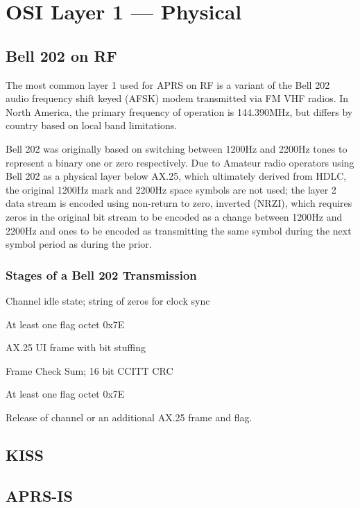 \chapter{OSI Layer 1 --- Physical}

\section{Bell 202 on RF}

The most common layer 1 used for APRS on RF is a variant of the
Bell 202 audio frequency shift keyed (AFSK) modem transmitted via 
FM VHF radios. In North America, the primary frequency of operation is
144.390MHz, but differs by country based on local band limitations.

Bell 202 was originally  based on switching between 1200Hz and 2200Hz tones to
represent a binary one or zero respectively. Due to Amateur radio operators
using Bell 202 as a physical layer below AX.25, which ultimately derived 
from HDLC, the original 1200Hz mark and 2200Hz space symbols are not used;
the layer 2 data stream is encoded using 
non-return to zero, inverted (NRZI),
which requires zeros in the original bit stream to be encoded as a change
between 1200Hz and 2200Hz and ones to be encoded as transmitting the same
symbol during the next symbol period as during the prior.

\subsection{Stages of a Bell 202 Transmission}

Channel idle state; string of zeros for clock sync

At least one flag octet 0x7E

AX.25 UI frame with bit stuffing

Frame Check Sum; 16 bit CCITT CRC

At least one flag octet 0x7E

Release of channel or an additional AX.25 frame and flag. 

\section{KISS}

\section{APRS-IS}


